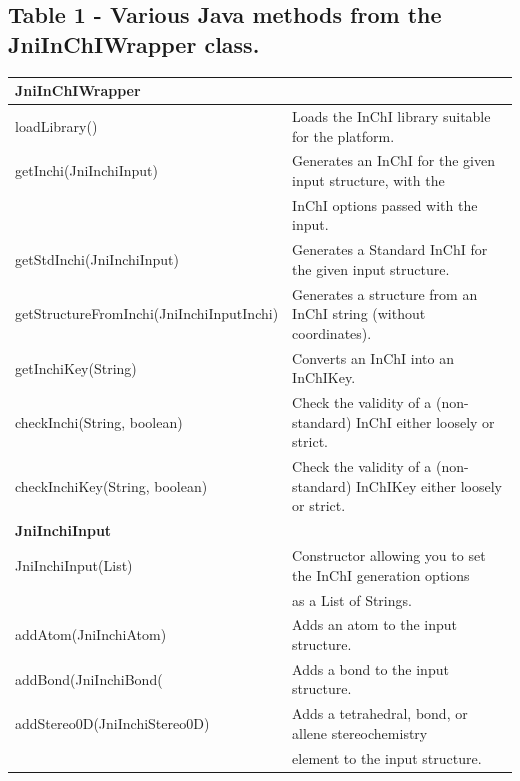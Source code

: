 \documentclass[10pt]{bmc_article}
\newenvironment{bmcformat}{\fussy\setboolean{publ}{true}}{\fussy}
\begin{document}
\begin{bmcformat}
  \subsection*{Table 1 - Various Java methods from the JniInChIWrapper class.}
  \label{tab:wrapper}
\begin{tabular}{ll}
\textbf{JniInChIWrapper} & \\
\hline
loadLibrary() & Loads the InChI library suitable for the platform. \\
getInchi(JniInchiInput) & Generates an InChI for the given input structure, with the \\
                        & InChI options passed with the input. \\
getStdInchi(JniInchiInput) & Generates a Standard InChI for the given input structure. \\
getStructureFromInchi(JniInchiInputInchi) & Generates a structure from an InChI string (without coordinates). \\
getInchiKey(String) & Converts an InChI into an InChIKey. \\
checkInchi(String, boolean) & Check the validity of a (non-standard) InChI either loosely or strict. \\
checkInchiKey(String, boolean) & Check the validity of a (non-standard) InChIKey either loosely or strict. \\
\hline
\textbf{JniInchiInput} & \\
\hline
JniInchiInput(List) & Constructor allowing you to set the InChI generation options \\
                     & as a List of Strings. \\
addAtom(JniInchiAtom) & Adds an atom to the input structure. \\
addBond(JniInchiBond( & Adds a bond to the input structure. \\
addStereo0D(JniInchiStereo0D) & Adds a tetrahedral, bond, or allene stereochemistry \\
                              & element to the input structure. \\
\end{tabular}





\end{bmcformat}
\end{document}
